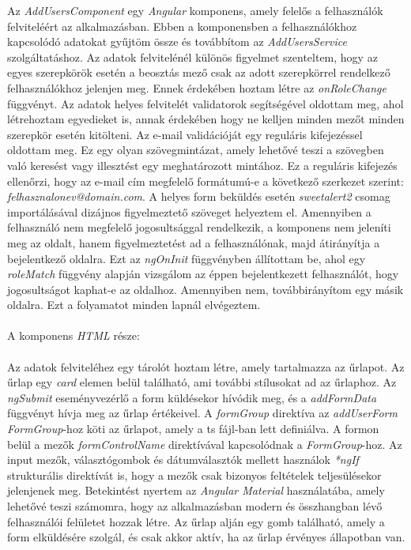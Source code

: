 Az \textit{AddUsersComponent} egy \textit{Angular} komponens, amely felelős a felhasználók felviteléért az alkalmazásban. Ebben a komponensben a felhasználókhoz kapcsolódó adatokat gyűjtöm össze és továbbítom az \textit{AddUsersService} szolgáltatáshoz. Az adatok felvitelénél különös figyelmet szenteltem, hogy az egyes szerepkörök esetén a beosztás mező csak az adott szerepkörrel rendelkező felhasználókhoz jelenjen meg. Ennek érdekében hoztam létre az \textit{onRoleChange} függvényt. Az adatok helyes felvitelét validatorok segítségével oldottam meg, ahol létrehoztam egyedieket is, annak érdekében hogy ne kelljen minden mezőt minden szerepkör esetén kitölteni. Az e-mail validációját egy reguláris kifejezéssel oldottam meg. Ez egy olyan szövegmintázat, amely lehetővé teszi a szövegben való keresést vagy illesztést egy meghatározott mintához. Ez a reguláris kifejezés ellenőrzi, hogy az e-mail cím megfelelő formátumú-e a következő szerkezet szerint: \textit{felhasznalonev@domain.com}. A helyes form beküldés esetén \textit{sweetalert2} csomag importálásával dizájnos figyelmeztető szöveget helyeztem el. Amennyiben a felhasználó nem megfelelő jogosultsággal rendelkezik, a komponens nem jeleníti meg az oldalt, hanem figyelmeztetést ad a felhasználónak, majd átirányítja a bejelentkező oldalra. Ezt az \textit{ngOnInit} függvényben állítottam be, ahol egy \textit{roleMatch} függvény alapján vizsgálom az éppen bejelentkezett felhasználót, hogy jogosultságot kaphat-e az oldalhoz. Amennyiben nem, továbbirányítom egy másik oldalra. Ezt a folyamatot minden lapnál elvégeztem.\\
\\A komponens \textit{HTML} része:\\
\\
Az adatok felviteléhez egy tárolót hoztam létre, amely tartalmazza az űrlapot. Az űrlap egy \textit{card} elemen belül található, ami további stílusokat ad az űrlaphoz. Az \textit{ngSubmit} eseményvezérlő a form küldésekor hívódik meg, és a \textit{addFormData} függvényt hívja meg az űrlap értékeivel. A \textit{formGroup} direktíva az \textit{addUserForm} \textit{FormGroup}-hoz köti az űrlapot, amely a ts fájl-ban lett definiálva. A formon belül a mezők \textit{formControlName} direktívával kapcsolódnak a \textit{FormGroup}-hoz. Az input mezők, választógombok és dátumválasztók mellett használok \textit{*ngIf} strukturális direktívát is, hogy a mezők csak bizonyos feltételek teljesülésekor jelenjenek meg. Betekintést nyertem az \textit{Angular Material} használatába, amely lehetővé teszi számomra, hogy az alkalmazásban modern és összhangban lévő felhasználói felületet hozzak létre. Az űrlap alján egy gomb található, amely a form elküldésére szolgál, és csak akkor aktív, ha az űrlap érvényes állapotban van. 

